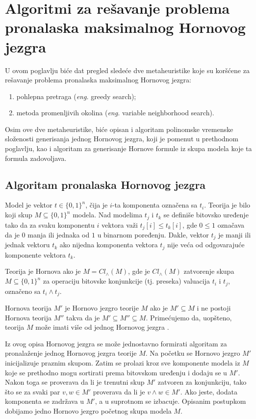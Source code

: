 \documentclass[12pt,oneside]{memoir}
\begin{document}
\chapter{Algoritmi za rešavanje problema pronalaska maksimalnog Hornovog jezgra}
U ovom poglavlju biće dat pregled sledeće dve metaheuristike koje su koršćene za rešavanje problema pronalaska maksimalnog Hornovog jezgra:
\label{chap:chapter2}

\begin{enumerate}
  \item pohlepna pretraga (\textit{eng.} greedy search);
  \item metoda promenljivih okolina (\textit{eng.} variable neighborhood search).
\end{enumerate}
Osim ove dve metaheuristike, biće opisan i algoritam polinomske vremenske složenosti generisanja jednog Hornovog jezgra, koji je pomenut u prethodnom poglavlju, kao i algoritam za generisanje Hornove formule iz skupa modela koje ta formula zadovoljava.

\section{Algoritam pronalaska Hornovog jezgra}

Model je vektor $t \in \{0,1\}^n$, čija je $i$-ta komponenta označena sa $t_i$. Teorija je bilo koji skup $M \subseteq \{0,1\}^n$ modela. Nad modelima $t_j$ i $t_k$ se definiše bitovsko uređenje tako da za svaku komponentu $i$ vektora važi $t_j[i] \leq t_k[i]$, gde $0 \leq 1$ označava da je $0$ manja ili jednaka od $1$ u binarnom poređenju. Dakle, vektor $t_j$ je manji ili jednak vektoru $t_k$ ako nijedna komponenta vektora $t_j$ nije veća od odgovarajuće komponente vektora $t_k$.

Teorija je Hornova ako je $M = Cl_{\land}(M)$, gde je $Cl_{\land}(M)$ zatvorenje skupa $M \subseteq \{0,1\}^n$ za operaciju bitovske konjunkcije (tj. preseka) valuacija $t_i$ i $t_j$, označeno sa $t_i \land t_j$.

Hornova teorija $M'$ je Hornovo jezgro teorije $M$ ako je $M' \subseteq M$ i ne postoji Hornova teorija $M''$ takva da je $M' \subseteq M'' \subseteq M$. Primećujemo da, uopšteno, teorija $M$ može imati više od jednog Hornovog jezgra \cite{doc1}.

Iz ovog opisa Hornovog jezgra se može jednostavno formirati algoritam za pronalaženje jednog Hornovog jezgra teorije $M$. Na početku se Hornovo jezgro $M'$ inicijalizuje praznim skupom. Zatim se prolazi kroz sve komponente modela iz $M$ koje se prethodno mogu sortirati prema bitovskom uređenju i dodaju se u $M'$. Nakon toga se proverava da li je trenutni skup $M'$ zatvoren za konjunkciju, tako što se za svaki par $v, w \in M'$ proverava da li je $v \land w \in M'$. Ako jeste, dodata komponenta se zadržava u $M'$, a u suprotnom se izbacuje. Opisanim postupkom dobijamo jedno Hornovo jezgro početnog skupa modela $M$.\\
\end{document}
